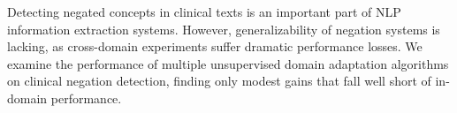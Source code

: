 Detecting negated concepts in clinical texts is an important part of NLP information extraction systems. However, generalizability of negation systems is lacking, as cross-domain experiments suffer dramatic performance losses. We examine the performance of multiple unsupervised domain adaptation algorithms on clinical negation detection, finding only modest gains that fall well short of in-domain performance.
